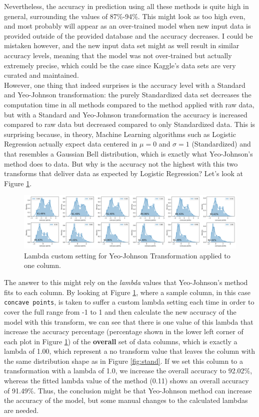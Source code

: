 \documentclass[11pt]{article}
\begin{document}
Nevertheless, the accuracy in prediction using all these methods is quite high in general, surrounding the values of 87\%-94\%. This might look as too high even, and most probably will appear as an over-trained model when new input data is provided outside of the provided database and the accuracy decreases. I could be mistaken however, and the new input data set might as well result in similar accuracy levels, meaning that the model was not over-trained but actually extremely precise, which could be the case since Kaggle's data sets are very curated and maintained.
\\

However, one thing that indeed surprises is the accuracy level with a Standard and Yeo-Johnson transformation: the purely Standardized data set decreases the computation time in all methods compared to the method applied with raw data, but with a Standard and Yeo-Johnson transformation the accuracy is increased compared to raw data but decreased compared to only Standardized data. This is surprising because, in theory, Machine Learning algorithms such as Logistic Regression actually expect data centered in $\mu = 0$ and $\sigma = 1$ (Standardized) and that resembles a Gaussian Bell distribution, which is exactly what Yeo-Johnson's method does to data. But why is the accuracy not the highest with this two transforms that deliver data as expected by Logistic Regression? Let's look at Figure \ref{fig:lambdas}.

\begin{figure}[!ht]
\centering
    \includegraphics[width=7in]{lambdas.png}
    \caption{Lambda custom setting for Yeo-Johnson Transformation applied to one column.}
    \label{fig:lambdas}
\end{figure}

The answer to this might rely on the \textit{lambda} values that Yeo-Johnson's method fits to each column. By looking at Figure \ref{fig:lambdas}, where a sample column, in this case \verb$concave points$, is taken to suffer a custom lambda setting each time in order to cover the full range from -1 to 1 and then calculate the new accuracy of the model with this transform, we can see that there is one value of this lambda that increase the accuracy percentage (percentage shown in the lower left corner of each plot in Figure \ref{fig:lambdas}) of the \textbf{overall} set of data columns, which is exactly a lambda of 1.00, which represent a no transform value that leaves the column with the same distribution shape as in Figure \ref{fig:stand}. If we set this column to a transformation with a lambda of 1.0, we increase the overall accuracy to 92.02\%, whereas the fitted lambda value of the method (0.11) shows an overall accuracy of 91.49\%. Thus, the conclusion might be that Yeo-Johnson method can increase the accuracy of the model, but some manual changes to the calculated lambdas are needed.
\\
\end{document}
